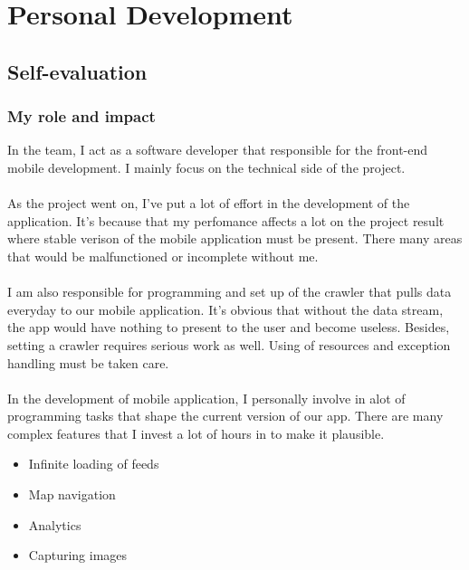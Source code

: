 \chapter{Personal Development}
\section{Self-evaluation}
\subsection{My role and impact}
In the team, I act as a software developer that responsible for the front-end mobile development. I mainly focus on the technical side of the project.
\\
\\
As the project went on, I've put a lot of effort in the development of the application. It's because that my perfomance affects a lot on the project result where stable verison of the mobile application must be present. There many areas that would be malfunctioned or incomplete without me.
\\
\\
I am also responsible for programming and set up of the crawler that pulls data everyday to our mobile application. It's obvious that without the data stream, the app would have nothing to present to the user and become useless. Besides, setting a crawler requires serious work as well. Using of resources and exception handling must be taken care.
\\
\\
In the development of mobile application, I personally involve in alot of programming tasks that shape the current version of our app. There are many complex features that I invest a lot of hours in to make it plausible.
\begin{itemize}
\item{Infinite loading of feeds}
\item{Map navigation}
\item{Analytics}
\item{Capturing images}
\end{itemize}
